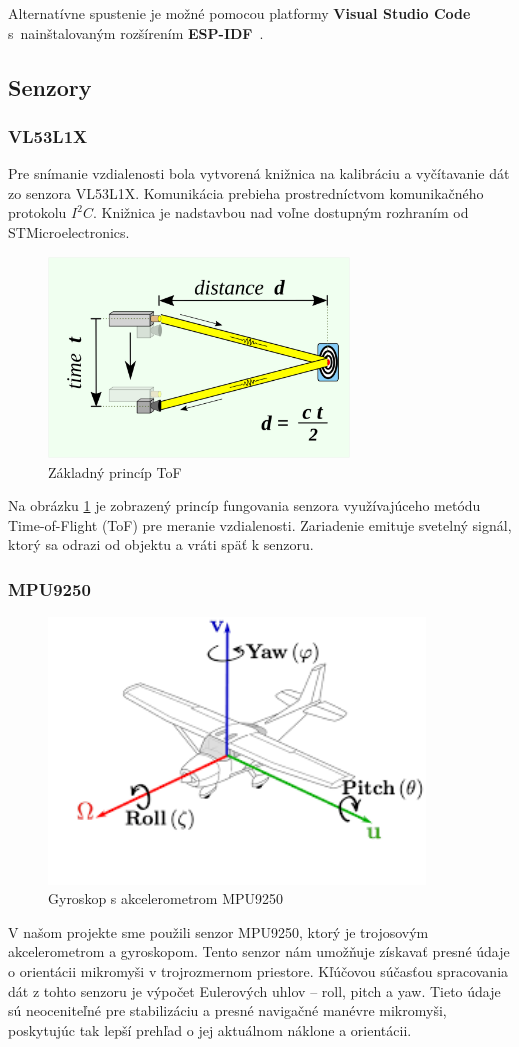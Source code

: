 Alternatívne spustenie je možné pomocou platformy \textbf{Visual Studio Code} s~nainštalovaným rozšírením
\textbf{ESP-IDF}~\cite{espIDF}.
\newpage
\subsection{Senzory}
\subsubsection{VL53L1X}
Pre snímanie vzdialenosti bola vytvorená knižnica na kalibráciu a vyčítavanie dát zo senzora VL53L1X. Komunikácia prebieha prostredníctvom komunikačného protokolu $I^2 C$. Knižnica je nadstavbou nad voľne dostupným rozhraním od STMicroelectronics.
\begin{figure}[!htpb]
    \centering
    \includegraphics[width=8cm]{includes//images/tof_pic.png}
    \caption{Základný princíp ToF}
    \label{fig:tof_pic}
\end{figure}
Na obrázku \ref{fig:tof_pic} je zobrazený princíp fungovania senzora využívajúceho metódu Time-of-Flight (ToF) pre meranie vzdialenosti. Zariadenie emituje svetelný signál, ktorý sa odrazi od objektu a vráti späť k senzoru.
\subsubsection{MPU9250}
\begin{figure}[!htpb]
    \centering
    \includegraphics[width=10cm]{includes//images/rpy.png}
    \caption{Gyroskop s akcelerometrom MPU9250 }
    \label{fig:rpy}
\end{figure}
V našom projekte sme použili senzor MPU9250, ktorý je trojosovým akcelerometrom a gyroskopom. Tento senzor nám umožňuje získavať presné údaje o orientácii mikromyši v trojrozmernom priestore. Kľúčovou súčasťou spracovania dát z tohto senzoru je výpočet Eulerových uhlov -- roll, pitch a yaw. Tieto údaje sú neoceniteľné pre stabilizáciu a presné navigačné manévre mikromyši, poskytujúc tak lepší prehľad o jej aktuálnom náklone a orientácii.

